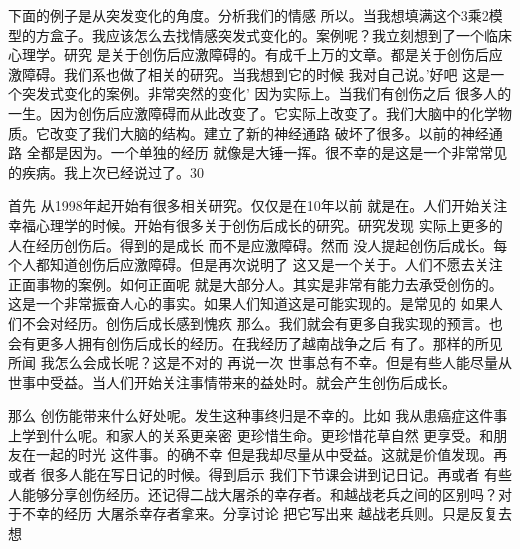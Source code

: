 下面的例子是从突发变化的角度。分析我们的情感 所以。当我想填满这个3乘2模型的方盒子。我应该怎么去找情感突发式变化的。案例呢？我立刻想到了一个临床心理学。研究 是关于创伤后应激障碍的。有成千上万的文章。都是关于创伤后应激障碍。我们系也做了相关的研究。当我想到它的时候 我对自己说。'好吧 这是一个突发式变化的案例。非常突然的变化' 因为实际上。当我们有创伤之后 很多人的一生。因为创伤后应激障碍而从此改变了。它实际上改变了。我们大脑中的化学物质。它改变了我们大脑的结构。建立了新的神经通路 破坏了很多。以前的神经通路 全都是因为。一个单独的经历 就像是大锤一挥。很不幸的是这是一个非常常见的疾病。我上次已经说过了。30%

首先 从1998年起开始有很多相关研究。仅仅是在10年以前 就是在。人们开始关注幸福心理学的时候。开始有很多关于创伤后成长的研究。研究发现 实际上更多的人在经历创伤后。得到的是成长 而不是应激障碍。然而 没人提起创伤后成长。每个人都知道创伤后应激障碍。但是再次说明了 这又是一个关于。人们不愿去关注正面事物的案例。如何正面呢 就是大部分人。其实是非常有能力去承受创伤的。这是一个非常振奋人心的事实。如果人们知道这是可能实现的。是常见的 如果人们不会对经历。创伤后成长感到愧疚 那么。我们就会有更多自我实现的预言。也会有更多人拥有创伤后成长的经历。在我经历了越南战争之后 有了。那样的所见所闻 我怎么会成长呢？这是不对的 再说一次 世事总有不幸。但是有些人能尽量从世事中受益。当人们开始关注事情带来的益处时。就会产生创伤后成长。 

那么 创伤能带来什么好处呢。发生这种事终归是不幸的。比如 我从患癌症这件事上学到什么呢。和家人的关系更亲密 更珍惜生命。更珍惜花草自然 更享受。和朋友在一起的时光 这件事。的确不幸 但是我却尽量从中受益。这就是价值发现。再或者 很多人能在写日记的时候。得到启示 我们下节课会讲到记日记。再或者 有些人能够分享创伤经历。还记得二战大屠杀的幸存者。和越战老兵之间的区别吗？对于不幸的经历 大屠杀幸存者拿来。分享讨论 把它写出来 越战老兵则。只是反复去想 

